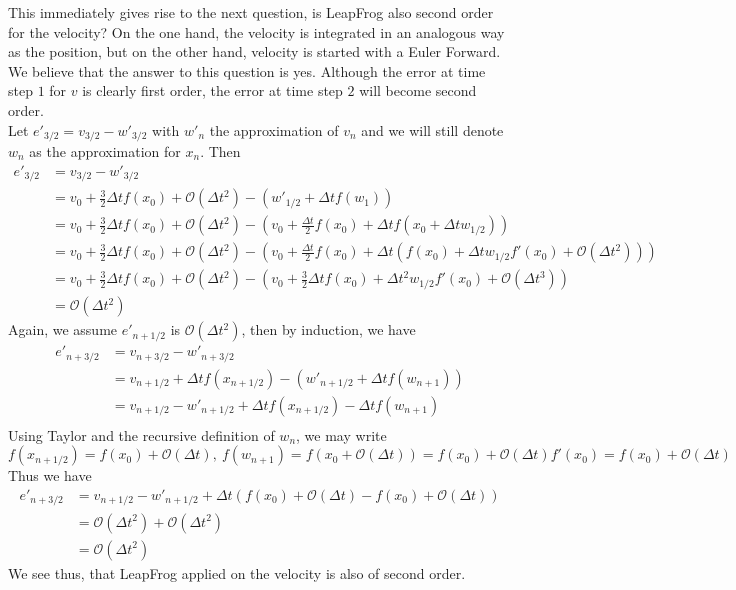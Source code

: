 \documentclass{article}
\begin{document}
This immediately gives rise to the next question, is LeapFrog also second order for the velocity? On the one hand, the velocity is integrated in an analogous way as the position, but on the other hand, velocity is started with a Euler Forward. We believe that the answer to this question is yes. Although the error at time step $1$ for $v$ is clearly first order, the error at time step $2$ will become second order.\\

Let $e'_{3/2}=v_{3/2}-w'_{3/2}$ with $w'_n$ the approximation of $v_n$ and we will still denote $w_n$ as the approximation for $x_n$. Then
\begin{align*}
e'_{3/2}&=v_{3/2}-w'_{3/2}\\
		&=v_0+\frac{3}{2}\Delta t f(x_0)+\mathcal{O}(\Delta t^2)-(w'_{1/2}+\Delta t f(w_1))\\
		&=v_0+\frac{3}{2}\Delta t f(x_0)+\mathcal{O}(\Delta t^2)-(v_0+\frac{\Delta t}{2}f(x_0)+\Delta t f(x_0+\Delta t w_{1/2}))\\
		&=v_0+\frac{3}{2}\Delta t f(x_0)+\mathcal{O}(\Delta t^2)-(v_0+\frac{\Delta t}{2}f(x_0)+\Delta t (f(x_0)+\Delta t w_{1/2}f'(x_0)+\mathcal{O}(\Delta t^2)))\\
		&=v_0+\frac{3}{2}\Delta t f(x_0)+\mathcal{O}(\Delta t^2)-(v_0+\frac{3}{2}\Delta tf(x_0)+\Delta t^2 w_{1/2}f'(x_0)+\mathcal{O}(\Delta t^3))\\
		&=\mathcal{O}(\Delta t^2)
\end{align*}
Again, we assume $e'_{n+1/2}$ is $\mathcal{O}(\Delta t^2)$, then by induction, we have
\begin{align*}
e'_{n+3/2}&=v_{n+3/2}-w'_{n+3/2}\\
		  &=v_{n+1/2}+\Delta t f(x_{n+1/2})-(w'_{n+1/2}+\Delta t f(w_{n+1}))\\
		  &=v_{n+1/2}-w'_{n+1/2}+\Delta tf(x_{n+1/2})-\Delta tf(w_{n+1})\\
\end{align*}
Using Taylor and the recursive definition of $w_n$, we may write
\[f(x_{n+1/2})=f(x_0)+\mathcal{O}(\Delta t),~f(w_{n+1})=f(x_0+\mathcal{O}(\Delta t))=f(x_0)+\mathcal{O}(\Delta t)f'(x_0)=f(x_0)+\mathcal{O}(\Delta t)\]
Thus we have
\begin{align*}
e'_{n+3/2}&=v_{n+1/2}-w'_{n+1/2}+\Delta t(f(x_0)+\mathcal{O}(\Delta t)-f(x_0)+\mathcal{O}(\Delta t))\\
		  &=\mathcal{O}(\Delta t^2)+\mathcal{O}(\Delta t^2)\\
		  &=\mathcal{O}(\Delta t^2)
\end{align*}
We see thus, that LeapFrog applied on the velocity is also of second order.
\end{document}
